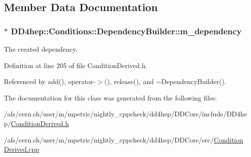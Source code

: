 \subsection{Member Data Documentation}
\hypertarget{class_d_d4hep_1_1_conditions_1_1_dependency_builder_a038744f80e334eb539859fbc60614836}{
\subsubsection[{m\_\-dependency}]{$\ast$ {\bf DD4hep::Conditions::DependencyBuilder::m\_\-dependency}}}
\label{class_d_d4hep_1_1_conditions_1_1_dependency_builder_a038744f80e334eb539859fbc60614836}


The created dependency. 

Definition at line 205 of file ConditionDerived.h.

Referenced by add(), operator-\/$>$(), release(), and $\sim$DependencyBuilder().

The documentation for this class was generated from the following files:\begin{DoxyCompactItemize}
\item 
/afs/cern.ch/user/m/mpetric/nightly\_\-cppcheck/dd4hep/DDCore/include/DD4hep/\hyperlink{_condition_derived_8h}{ConditionDerived.h}\item 
/afs/cern.ch/user/m/mpetric/nightly\_\-cppcheck/dd4hep/DDCore/src/\hyperlink{_condition_derived_8cpp}{ConditionDerived.cpp}\end{DoxyCompactItemize}

